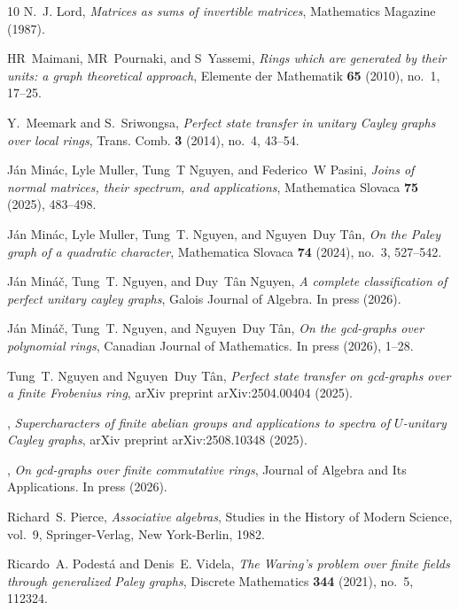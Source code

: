 \documentclass[12pt, a4paper]{amsart}
\theoremstyle{definition}
\numberwithin{equation}{section}
\begin{document}
\begin{thebibliography}{10}
N.~J. Lord, \emph{Matrices as sums of invertible matrices}, Mathematics Magazine (1987).

HR~Maimani, MR~Pournaki, and S~Yassemi, \emph{Rings which are generated by their units: a graph theoretical approach}, Elemente der Mathematik \textbf{65} (2010), no.~1, 17--25.

Y.~Meemark and S.~Sriwongsa, \emph{Perfect state transfer in unitary {C}ayley graphs over local rings}, Trans. Comb. \textbf{3} (2014), no.~4, 43--54. 

J{\'a}n Min{\'a}c, Lyle Muller, Tung~T Nguyen, and Federico~W Pasini, \emph{Joins of normal matrices, their spectrum, and applications}, Mathematica Slovaca \textbf{75} (2025), 483--498.

J{\'a}n Min{\'a}c, Lyle Muller, Tung~T. Nguyen, and Nguyen~Duy T{\^a}n, \emph{On the {Paley} graph of a quadratic character}, Mathematica Slovaca \textbf{74} (2024), no.~3, 527--542.

J{\'a}n Min{\'a}{\v{c}}, Tung~T. Nguyen, and Duy~T{\^a}n Nguyen, \emph{A complete classification of perfect unitary cayley graphs}, Galois Journal of Algebra. In press (2026).

J{\'a}n Min{\'a}{\v{c}}, Tung~T. Nguyen, and Nguyen~Duy T{\^a}n, \emph{On the gcd-graphs over polynomial rings}, Canadian Journal of Mathematics. In press (2026), 1--28.

Tung~T. Nguyen and Nguyen~Duy T{\^a}n, \emph{Perfect state transfer on gcd-graphs over a finite {Frobenius} ring}, arXiv preprint arXiv:2504.00404 (2025).

\bysame, \emph{Supercharacters of finite abelian groups and applications to spectra of ${U}$-unitary {Cayley} graphs}, arXiv preprint arXiv:2508.10348 (2025).

\bysame, \emph{On gcd-graphs over finite commutative rings}, Journal of Algebra and Its Applications. In press (2026).

Richard~S. Pierce, \emph{Associative algebras}, Studies in the History of Modern Science, vol.~9, Springer-Verlag, New York-Berlin, 1982. 

Ricardo~A. Podest{\'a} and Denis~E. Videla, \emph{The {Waring}’s problem over finite fields through generalized {Paley} graphs}, Discrete Mathematics \textbf{344} (2021), no.~5, 112324.


\end{thebibliography}
\end{document}
